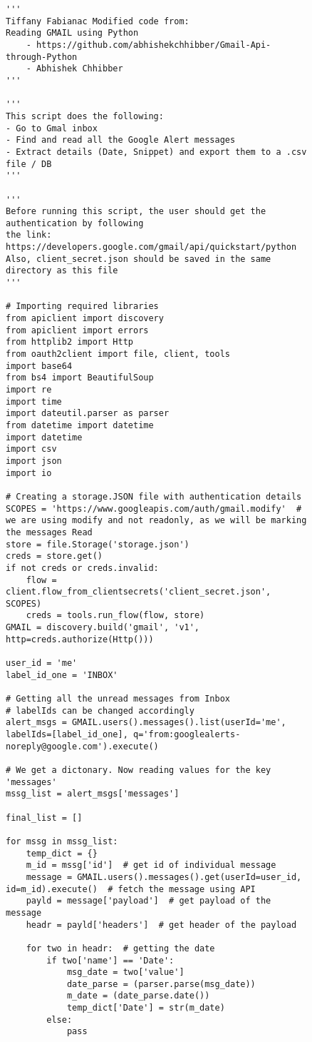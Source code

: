 \documentclass[sigconf]{acmart}
\begin{document}
\begin{figure}[htb]
\begin{verbatim}
'''
Tiffany Fabianac Modified code from:
Reading GMAIL using Python
    - https://github.com/abhishekchhibber/Gmail-Api-through-Python
	- Abhishek Chhibber
'''

'''
This script does the following:
- Go to Gmal inbox
- Find and read all the Google Alert messages
- Extract details (Date, Snippet) and export them to a .csv file / DB
'''

'''
Before running this script, the user should get the authentication by following 
the link: https://developers.google.com/gmail/api/quickstart/python
Also, client_secret.json should be saved in the same directory as this file
'''

# Importing required libraries
from apiclient import discovery
from apiclient import errors
from httplib2 import Http
from oauth2client import file, client, tools
import base64
from bs4 import BeautifulSoup
import re
import time
import dateutil.parser as parser
from datetime import datetime
import datetime
import csv
import json
import io

# Creating a storage.JSON file with authentication details
SCOPES = 'https://www.googleapis.com/auth/gmail.modify'  # we are using modify and not readonly, as we will be marking the messages Read
store = file.Storage('storage.json')
creds = store.get()
if not creds or creds.invalid:
    flow = client.flow_from_clientsecrets('client_secret.json', SCOPES)
    creds = tools.run_flow(flow, store)
GMAIL = discovery.build('gmail', 'v1', http=creds.authorize(Http()))

user_id = 'me'
label_id_one = 'INBOX'

# Getting all the unread messages from Inbox
# labelIds can be changed accordingly
alert_msgs = GMAIL.users().messages().list(userId='me', labelIds=[label_id_one], q='from:googlealerts-noreply@google.com').execute()

# We get a dictonary. Now reading values for the key 'messages'
mssg_list = alert_msgs['messages']

final_list = []

for mssg in mssg_list:
    temp_dict = {}
    m_id = mssg['id']  # get id of individual message
    message = GMAIL.users().messages().get(userId=user_id, id=m_id).execute()  # fetch the message using API
    payld = message['payload']  # get payload of the message
    headr = payld['headers']  # get header of the payload

    for two in headr:  # getting the date
        if two['name'] == 'Date':
            msg_date = two['value']
            date_parse = (parser.parse(msg_date))
            m_date = (date_parse.date())
            temp_dict['Date'] = str(m_date)
        else:
            pass


\end{verbatim}
\end{figure}
\end{document}
